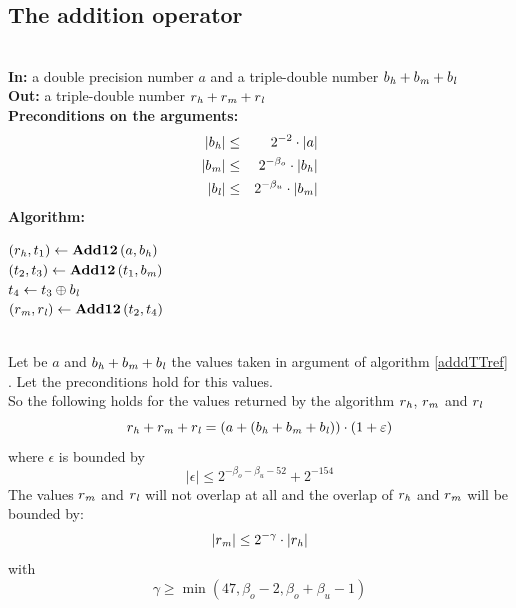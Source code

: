 \subsection{The addition operator \AdddTT}
\begin{algorithm}[\AdddTT] \label{adddTTref} ~ \\
{\bf In:} a double precision number $a$ and a triple-double number $b_{\mathit{h}} + b_{\mathit{m}} + b_{\mathit{l}}$ \\
{\bf Out:} a triple-double number $r_{\mathit{h}} + r_{\mathit{m}} + r_{\mathit{l}}$ \\
{\bf Preconditions on the arguments:}
\begin{eqnarray*}
\left \vert b_{\mathit{h}} \right \vert & \leq & 2^{-2} \cdot \left \vert a \right \vert \\
\left \vert b_{\mathit{m}} \right \vert & \leq & 2^{-\beta_o} \cdot \left \vert b_{\mathit{h}} \right \vert \\
\left \vert b_{\mathit{l}} \right \vert & \leq & 2^{-\beta_u} \cdot \left \vert b_{\mathit{m}} \right \vert 
\end{eqnarray*}
{\bf Algorithm:} \\
\begin{center}
\begin{minipage}[b]{50mm}
$\left( r_{\mathit{h}}, t_1 \right) \gets \mathbf{Add12}\left( a, b_{\mathit{h}} \right)$ \\
$\left( t_2, t_3 \right) \gets \mathbf{Add12}\left( t_1, b_{\mathit{m}} \right)$ \\
$t_4 \gets t_3 \oplus b_{\mathit{l}}$ \\
$\left( r_{\mathit{m}}, r_{\mathit{l}} \right) \gets \mathbf{Add12}\left( t_2, t_4 \right)$ \\
\end{minipage}
\end{center}
\end{algorithm}
\begin{theorem} ~ \\
Let be $a$ and $b_{\mathit{h}} + b_{\mathit{m}} + b_{\mathit{l}}$ the values taken in argument of algorithm \ref{adddTTref} \AdddTT. 
Let the preconditions hold for this values.\\
So the following holds for the values returned by the algorithm $r_{\mathit{h}}$, $r_{\mathit{m}}$ and $r_{\mathit{l}}$ 
$$r_{\mathit{h}} + r_{\mathit{m}} + r_{\mathit{l}} = \left(a + \left( b_{\mathit{h}} + b_{\mathit{m}} + b_{\mathit{l}} \right)\right) \cdot \left(1 + \varepsilon\right)$$
where $\epsilon$ is bounded by
$$\left \vert \epsilon \right \vert \leq 2^{-\beta_o - \beta_u - 52} + 2^{-154}$$
The values $r_{\mathit{m}}$ and $r_{\mathit{l}}$ will not overlap at all and the overlap of $r_{\mathit{h}}$ and $r_{\mathit{m}}$ will be bounded by:
$$\left \vert r_{\mathit{m}} \right \vert \leq 2^{-\gamma} \cdot \left \vert r_{\mathit{h}} \right \vert$$
with
$$\gamma \geq \min\left( 47, \beta_o - 2, \beta_o + \beta_u - 1 \right)$$
\end{theorem}

